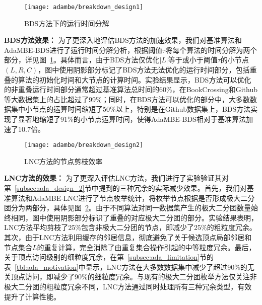 \begin{figure} [H]
	\centering
	\texttt{[image: adambe/breakdown\_design1]}
	\caption{BDS方法下的运行时间分解}

	\label{fig:ada_breakdown_design1}
\end{figure}


\textbf{BDS方法效果：} 为了更深入地评估BDS方法的加速效果，我们对基准算法和AdaMBE-BDS进行了运行时间分解分析，根据阈值$\tau$将每个算法的时间分解为两个部分，详见图~\ref{fig:ada_breakdown_design1}。具体而言，由于BDS方法仅优化$|L|$等于或小于阈值$\tau$的小节点$(L, R, C)$，图中使用阴影部分标记了BDS方法无法优化的运行时间部分，包括重叠的算法的初始化时间和大节点的计算时间。实验结果显示，BDS方法可以优化的非重叠运行时间部分通常超过基准算法总时间的60\%，在BookCrossing和Github等大数据集上的占比超过了99\%；同时，在BDS方法可以优化的部分中，大多数数据集中小节点的运算时间缩短了50\%以上，特别是在Github数据集上，BDS方法实现了显著地缩短了91\%的小节点运算时间，使得AdaMBE-BDS相对于基准算法加速了10.7倍。


\begin{figure} [t]
	\centering
	\texttt{[image: adambe/breakdown\_design2]}
   \vspace{-0.1in}
	\caption{LNC方法的节点剪枝效率}

	\label{fig:ada_breakdown_design2}
\end{figure}

\textbf{LNC方法的效果：}  为了更深入评估LNC方法，我们进行了实验验证其对第~\ref{subsec:ada_design_2}节中提到的三种冗余的实际减少效果。首先，我们对基准算法和AdaMBE-LNC进行了节点枚举统计，将枚举节点根据是否形成极大二分团分为两部分，具体见图~\ref{fig:ada_breakdown_design2}。由于不同算法对同一数据集产生的极大二分团数量始终相同，图中使用阴影部分标识了重叠的对应极大二分团的部分。实验结果表明，LNC方法平均剪枝了25\%包含非极大二分团的节点，即减少了25\%的粗粒度冗余。其次，由于LNC方法利用缓存的邻居信息，彻底避免了关于候选顶点局部邻居和节点集合$L$的重复计算，完全消除了由重复集合操作引起的中等粒度冗余。最后，关于顶点访问级别的细粒度冗余，在第~\ref{subsec:ada_limitation}节的表~\ref{tbl:ada_motivation}中显示，LNC方法在大多数数据集中减少了超过90\%的无关顶点访问，即减少了90\%的细粒度冗余。与现有的极大二分团枚举方法仅关注非极大二分团的粗粒度冗余不同，LNC方法通过同时处理所有三种冗余类型，有效提升了计算性能。



